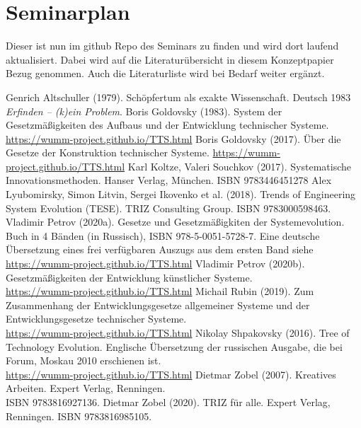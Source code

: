 \documentclass[11pt,a4paper]{article}
\begin{document}
\section{Seminarplan}

Dieser ist nun im github Repo des Seminars zu finden und wird dort laufend
aktualisiert.  Dabei wird auf die Literaturübersicht in diesem Konzeptpapier
Bezug genommen. Auch die Literaturliste wird bei Bedarf weiter ergänzt. 

\begin{thebibliography}{xxx}
 Genrich Altschuller (1979).  Schöpfertum als exakte
  Wissenschaft.  Deutsch 1983 \emph{Erfinden -- (k)ein Problem}.
 Boris Goldovsky (1983). System der Gesetzmäßigkeiten
  des Aufbaus und der Entwicklung technischer Systeme.
  \url{https://wumm-project.github.io/TTS.html}
 Boris Goldovsky (2017). Über die Gesetze der
  Konstruktion technischer Systeme.  
  \url{https://wumm-project.github.io/TTS.html}
 Karl Koltze, Valeri Souchkov (2017).
  Systematische Innovationsmethoden.  Hanser Verlag, München. ISBN
  9783446451278
 Alex Lyubomirsky, Simon Litvin, Sergei Ikovenko et al.
  (2018). Trends of Engineering System Evolution (TESE).  TRIZ Consulting
  Group. ISBN 9783000598463.
 Vladimir Petrov (2020a). Gesetze und Gesetzmäßigkiten
  der Systemevolution. Buch in 4 Bänden (in Russisch), ISBN
  978-5-0051-5728-7.  Eine deutsche Übersetzung eines frei verfügbaren Auszugs
  aus dem ersten Band siehe \\
  \url{https://wumm-project.github.io/TTS.html}
 Vladimir Petrov (2020b). Gesetzmäßigkeiten der
  Entwicklung künstlicher Systeme. \\
  \url{https://wumm-project.github.io/TTS.html} 
 Michail Rubin (2019). Zum Zusammenhang der
  Entwicklungsgesetze allgemeiner Systeme und der Entwicklungsgesetze
  technischer Systeme. \\ \url{https://wumm-project.github.io/TTS.html}
 Nikolay Shpakovsky (2016). Tree of Technology
  Evolution. Englische Übersetzung der russischen Ausgabe, die bei Forum,
  Moskau 2010 erschienen ist.\\ \url{https://wumm-project.github.io/TTS.html}
 Dietmar Zobel (2007). Kreatives Arbeiten. Expert Verlag,
  Renningen.\\ ISBN 9783816927136.
 Dietmar Zobel (2020). TRIZ für alle. Expert Verlag,
  Renningen. ISBN 9783816985105.
\end{thebibliography}
\end{document}
